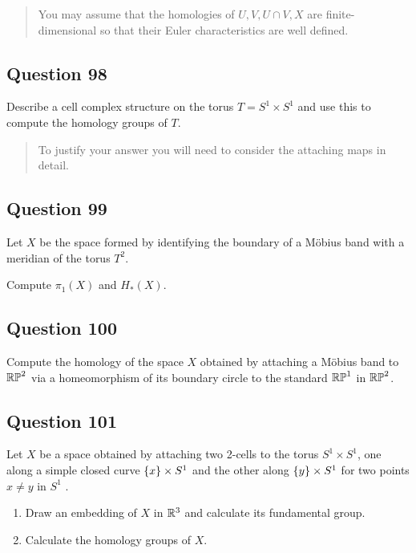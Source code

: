 \documentclass[12pt]{article}
\begin{document}
\begin{quote}
You may assume that the homologies of \(U, V, U \cap V, X\) are
finite-dimensional so that their Euler characteristics are well defined.
\end{quote}

\hypertarget{question-98-2}{%
\subsection{Question 98}\label{question-98-2}}

Describe a cell complex structure on the torus \(T = S^1 \times S^1\)
and use this to compute the homology groups of \(T\).

\begin{quote}
To justify your answer you will need to consider the attaching maps in
detail.
\end{quote}

\hypertarget{question-99-2}{%
\subsection{Question 99}\label{question-99-2}}

Let \(X\) be the space formed by identifying the boundary of a Möbius
band with a meridian of the torus \(T^2\).

Compute \(\pi_1 (X)\) and \(H_* (X)\).

\hypertarget{question-100-2}{%
\subsection{Question 100}\label{question-100-2}}

Compute the homology of the space \(X\) obtained by attaching a Möbius
band to \({\mathbb{RP}}^2\) via a homeomorphism of its boundary circle to the
standard \({\mathbb{RP}}^1\) in \({\mathbb{RP}}^2\).

\hypertarget{question-101-2}{%
\subsection{Question 101}\label{question-101-2}}

Let \(X\) be a space obtained by attaching two 2-cells to the torus
\(S^1 \times S^1\), one along a simple closed curve
\(\left\{{x}\right\} \times S^1\) and the other along \(\left\{{y}\right\} \times S^1\)
for two points \(x \neq y\) in \(S^1\) .

\begin{enumerate}
\def\labelenumi{\alph{enumi}.}
\item
  Draw an embedding of \(X\) in \({\mathbb{R}}^3\) and calculate its fundamental
  group.
\item
  Calculate the homology groups of \(X\).
\end{enumerate}
\end{document}
